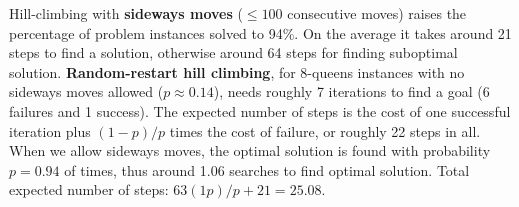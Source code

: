Hill-climbing with \textbf{sideways moves} ($\leq 100$ consecutive moves) raises the percentage of problem instances solved to 94\%. On the average it takes around 21 steps to find a solution, otherwise around 64 steps for finding suboptimal solution.\newline\newline
\textbf{Random-restart hill climbing}, for 8-queens instances with no sideways moves allowed ($p \approx 0.14$), needs roughly 7 iterations to find a goal (6 failures and 1 success). The expected number of steps is the cost of one successful iteration plus $(1-p)/p$ times the cost of failure, or roughly 22 steps in all. When we allow sideways moves, the optimal solution is found with probability $p = 0.94$ of times, thus around 1.06 searches to find optimal solution. Total expected number of steps: $63(1  p)/p + 21 = 25.08$.
